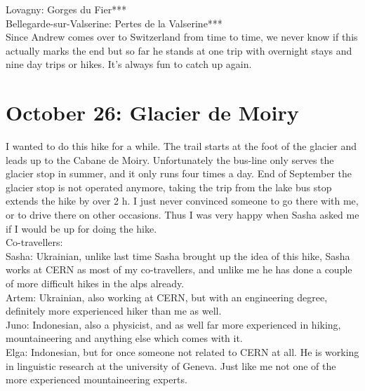 Lovagny: Gorges du Fier***\\
Bellegarde-sur-Valserine: Pertes de la Valserine***\\

Since Andrew comes over to Switzerland from time to time, we never know if this actually marks the end but so far he stands at one trip with overnight stays and nine day trips or hikes. It's always fun to catch up again.\\

\section{October 26: Glacier de Moiry}
\label{2019:Moiry}

I wanted to do this hike for a while. The trail starts at the foot of the glacier and leads up to the Cabane de Moiry. Unfortunately the bus-line only serves the glacier stop in summer, and it only runs four times a day. End of September the glacier stop is not operated anymore, taking the trip from the lake bus stop extends the hike by over 2 h. I just never convinced someone to go there with me, or to drive there on other occasions. Thus I was very happy when Sasha asked me if I would be up for doing the hike.\\

Co-travellers:\\
Sasha: Ukrainian, unlike last time Sasha brought up the idea of this hike, Sasha works at CERN as most of my co-travellers, and unlike me he has done a couple of more difficult hikes in the alps already. \\

Artem: Ukrainian, also working at CERN, but with an engineering degree, definitely more experienced hiker than me as well.\\

Juno: Indonesian, also a physicist, and as well far more experienced in hiking, mountaineering and anything else which comes with it.\\

Elga: Indonesian, but for once someone not related to CERN at all. He is working in linguistic research at the university of Geneva. Just like me not one of the more experienced mountaineering experts.\\

